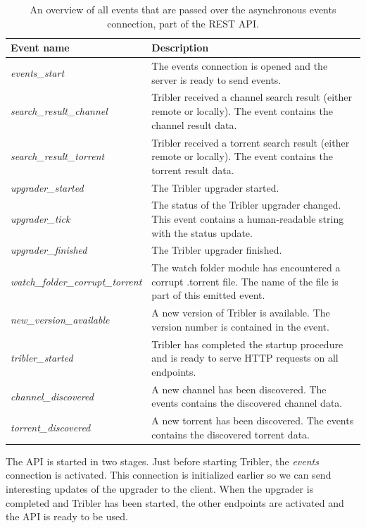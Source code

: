 \begin{table}
\begin{tabularx}{\textwidth}{|l|X|}
	\hline
	\textbf{Event name} & \textbf{Description} \\ \hline
	\emph{events\_start} & The events connection is opened and the server is ready to send events.  \\ \hline
	\emph{search\_result\_channel} & Tribler received a channel search result (either remote or locally). The event contains the channel result data. \\ \hline
	\emph{search\_result\_torrent} & Tribler received a torrent search result (either remote or locally). The event contains the torrent result data. \\ \hline
	\emph{upgrader\_started} & The Tribler upgrader started. \\ \hline
	\emph{upgrader\_tick} & The status of the Tribler upgrader changed. This event contains a human-readable string with the status update. \\ \hline
	\emph{upgrader\_finished} & The Tribler upgrader finished. \\ \hline
	\emph{watch\_folder\_corrupt\_torrent} & The watch folder module has encountered a corrupt .torrent file. The name of the file is part of this emitted event.\\ \hline
	\emph{new\_version\_available} & A new version of Tribler is available. The version number is contained in the event.\\ \hline
	\emph{tribler\_started} & Tribler has completed the startup procedure and is ready to serve HTTP requests on all endpoints.\\ \hline
	\emph{channel\_discovered} & A new channel has been discovered. The events contains the discovered channel data.\\ \hline
	\emph{torrent\_discovered} & A new torrent has been discovered. The events contains the discovered torrent data.\\ \hline
\end{tabularx}
\caption{An overview of all events that are passed over the asynchronous events connection, part of the REST API.}
\label{table:rest-api-events}
\end{table}

The API is started in two stages. Just before starting Tribler, the \emph{events} connection is activated. This connection is initialized earlier so we can send interesting updates of the upgrader to the client. When the upgrader is completed and Tribler has been started, the other endpoints are activated and the API is ready to be used.

